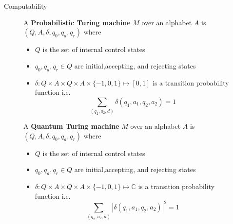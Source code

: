 \documentclass{beamer}
\begin{document}
\begin{frame}{Computability}

\begin{figure}[ht]
{\small
    \begin{minipage}{0.4\textwidth}
       A \textbf{Probabilistic Turing machine} $M$ over an alphabet $A$ is $\left(Q,A,\delta,q_0,q_a,q_r\right)$ where
       \begin{itemize}
         \item $Q$ is the set of internal control states
         \item $q_0,q_a,q_r\in Q$ are initial,accepting, and rejecting states
         \item $\delta:Q\times A\times Q\times A\times\{-1,0,1\}\mapsto [0,1]$ is a transition probability function i.e.
           \[
             \sum_{\left(q_2,a_2,d\right)}\delta\left(q_1,a_1,q_2,a_2\right)=1
           \]
       \end{itemize}
    \end{minipage}
    \qquad
    \begin{minipage}{0.4\textwidth}
       A \textbf{Quantum Turing machine} $M$ over an alphabet $A$ is $\left(Q,A,\delta,q_0,q_a,q_r\right)$ where
       \begin{itemize}
         \item $Q$ is the set of internal control states
         \item $q_0,q_a,q_r\in Q$ are initial,accepting, and rejecting states
         \item $\delta:Q\times A\times Q\times A\times\{-1,0,1\}\mapsto \mathbb{C}$ is a transition probability function i.e.
           \[
             \sum_{\left(q_2,a_2,d\right)}|\delta\left(q_1,a_1,q_2,a_2\right)|^2=1
           \]
       \end{itemize}
    \end{minipage}
}
\end{figure}

\end{frame}
\end{document}
